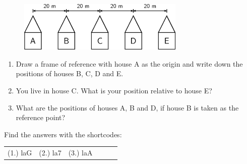 \begin{enumerate}[noitemsep, label=\textbf{\arabic*}. ]
    \setcounter{subfigure}{0}


	\begin{figure}[H] %
    \begin{center}
    \label{m38787*id62920!!!underscore!!!media}\label{m38787*id62920!!!underscore!!!printimage}\includegraphics[width=300px]{col11305.imgs/m38787_PG10C2_007.png} %
        
      \vspace{2pt}
    \vspace{.1in}
    
    \end{center}

 \end{figure}   

    \addtocounter{footnote}{-0}
    \label{m38787*id62926}\begin{enumerate}[noitemsep, label=\textbf{\alph*}. ] 
            \label{m38787*uid14}\item Draw a frame of reference with house A as the origin and write down the positions of houses B, C, D and E.
\label{m38787*uid15}\item You live in house C. What is your position relative to house E?
\label{m38787*uid16}\item What are the positions of houses A, B and D, if house B is taken as the reference point?
\end{enumerate}
                \end{enumerate}
        
        

      
    

  \label{m38787**end}
          
\par {} Find the answers with the shortcodes:
 \par \begin{tabular}[h]{cccccc}
 (1.) laG  &  (2.) la7  &  (3.) laA  & \end{tabular}



